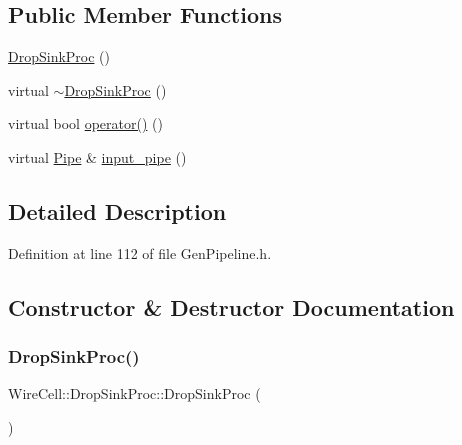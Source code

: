 \subsection*{Public Member Functions}
\begin{DoxyCompactItemize}
\item 
\hyperlink{class_wire_cell_1_1_drop_sink_proc_a75a7573650db9fa7f7dac73feab67381}{Drop\+Sink\+Proc} ()
\item 
virtual \hyperlink{class_wire_cell_1_1_drop_sink_proc_a160cdb8251d688487c88226b6a0209e9}{$\sim$\+Drop\+Sink\+Proc} ()
\item 
virtual bool \hyperlink{class_wire_cell_1_1_drop_sink_proc_a0bd6060109102714f2ee63aa340b9bcd}{operator()} ()
\item 
virtual \hyperlink{namespace_wire_cell_afce9bb01c731347c3d4c8ca9d4ed804f}{Pipe} \& \hyperlink{class_wire_cell_1_1_drop_sink_proc_ab7cd47b06032c02f22e39a16d9a1aba6}{input\+\_\+pipe} ()
\end{DoxyCompactItemize}


\subsection{Detailed Description}


Definition at line 112 of file Gen\+Pipeline.\+h.



\subsection{Constructor \& Destructor Documentation}
\mbox{\label{class_wire_cell_1_1_drop_sink_proc_a75a7573650db9fa7f7dac73feab67381}} 
\subsubsection{\texorpdfstring{Drop\+Sink\+Proc()}{DropSinkProc()}}
{\footnotesize\ttfamily Wire\+Cell\+::\+Drop\+Sink\+Proc\+::\+Drop\+Sink\+Proc (\begin{DoxyParamCaption}{ }\end{DoxyParamCaption})\hspace{0.3cm}{\ttfamily [inline]}}



